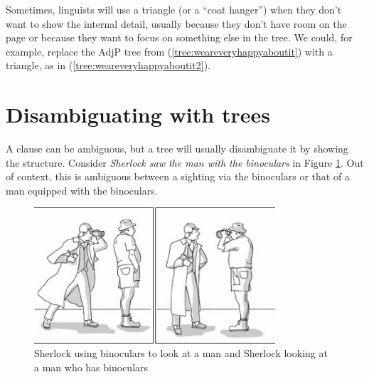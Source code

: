 Sometimes, linguists will use a triangle (or a ``coat hanger'') when they don't want to show the internal detail, usually because they don't have room on the page or because they want to focus on something else in the tree. We could, for example, replace the AdjP tree from (\ref{tree:weareveryhappyaboutit}) with a triangle, as in (\ref{tree:weareveryhappyaboutit2}).

\ea {}\label{tree:weareveryhappyaboutit2}
\z

\section{Disambiguating with trees}

A clause can be ambiguous, but a tree will usually disambiguate it by showing the structure. Consider \textit{Sherlock saw the man with the binoculars} in Figure \ref{fig:binoculars}. Out of context, this is ambiguous between a sighting via the binoculars or that of a man equipped with the binoculars.

\begin{figure}[h]
    \centering
    \includegraphics[width=0.8\textwidth]{figures/binoculars.png}
    \caption{Sherlock using binoculars to look at a man and Sherlock looking at a man who has binoculars}
    \label{fig:binoculars}
\end{figure}

